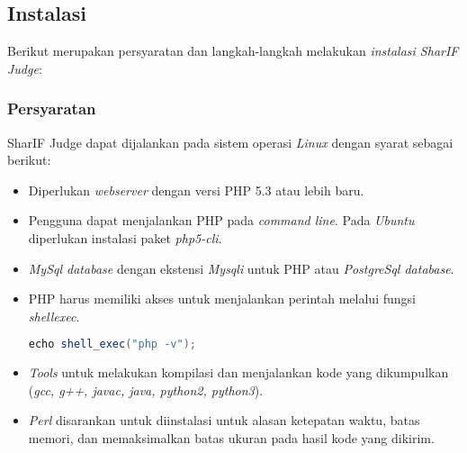 \subsection{Instalasi}
\label{subsec:instalasi}

Berikut merupakan persyaratan dan langkah-langkah melakukan \textit{instalasi SharIF Judge}:

\subsubsection{Persyaratan}
\label{subsubsec:persyaratan}
SharIF Judge dapat dijalankan pada sistem operasi \textit{Linux} dengan syarat sebagai berikut:
\begin{itemize}
\item Diperlukan \textit{webserver} dengan versi PHP 5.3 atau lebih baru.
\item Pengguna dapat menjalankan PHP pada \textit{command line}. Pada \textit{Ubuntu} diperlukan instalasi paket \textit{php5-cli}.
\item \textit{MySql database} dengan ekstensi \textit{Mysqli} untuk PHP atau \textit{PostgreSql database}.
\item PHP harus memiliki akses untuk menjalankan perintah melalui fungsi \textit{shell\textunderscore exec}.

\begin{lstlisting}[language=Java, caption=Kode untuk melakukah pengetesan fungsi, label=kode:shell]
	echo shell_exec("php -v");
\end{lstlisting}

\item \textit{Tools} untuk melakukan kompilasi dan menjalankan kode yang dikumpulkan (\textit{gcc, g++, javac, java, python2, python3}).
\item \textit{Perl} disarankan untuk diinstalasi untuk alasan ketepatan waktu, batas memori, dan memaksimalkan batas ukuran pada hasil kode yang dikirim.
\end{itemize}

